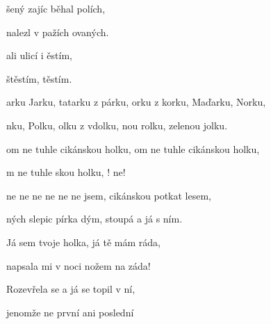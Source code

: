 

\zs
{}šený zajíc běhal
 polích,

 nalezl  v pažích
ovaných.

ali ulicí i
ěstím,

  štěstím,
těstím.
\ks

\zr
{}arku Jarku, tatarku z párku,
orku z korku, Maďarku, Norku,

nku, Polku, olku z vdolku,
nou rolku, zelenou jolku.

om ne tuhle cikánskou holku,
om ne tuhle cikánskou holku,

m ne tuhle skou holku,
! ne!

 ne ne ne ne ne ne  jsem,
 cikánskou  potkat  lesem,

ných slepic pírka  dým,
 stoupá  a já  s ním.
\kr

\zs
Já sem tvoje holka,
já tě mám ráda,

napsala mi v noci nožem
na záda!

Rozevřela se a já se
topil v ní,

jenomže ne první ani
poslední
\ks

\zr \kr

\kp





